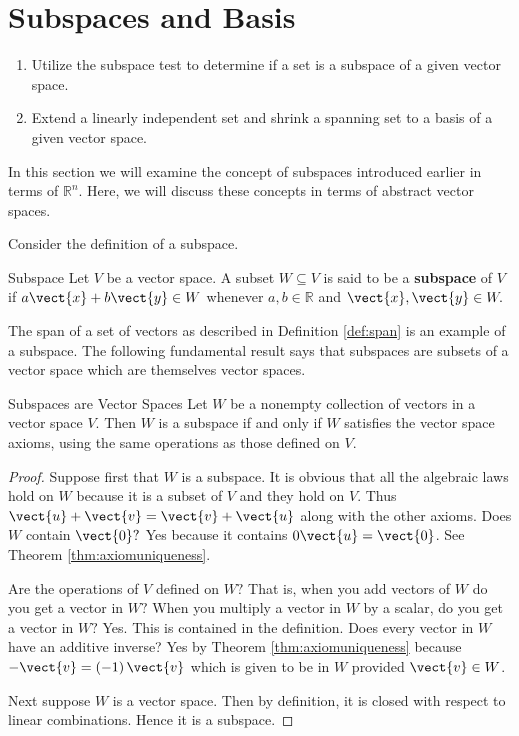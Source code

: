\section{Subspaces and Basis}

\begin{outcome}
\begin{enumerate}
\item[A.] Utilize the subspace test to determine if a set is a subspace of a given vector space.

\item[B.] Extend a linearly independent set and shrink a spanning set to a basis of a given vector space. 
\end{enumerate}
\end{outcome}

In this section we will examine the concept of subspaces introduced earlier in terms of $\mathbb{R}^n$. Here, we will discuss these concepts in terms of abstract vector spaces. 

Consider the definition of a subspace.

\begin{definition}{Subspace}\label{def:subspace}
Let $V$ be a vector space. A subset $W\subseteq V$ is said to be a \textbf{subspace} of $V$ if $a\vect{x}+b\vect{y}
\in W$ whenever $a,b\in \mathbb{R}$ and $\vect{x},\vect{y}\in W.$
\end{definition}

The span of a set of vectors as described in Definition \ref{def:span} is an example of a subspace. The following fundamental result says that subspaces are subsets of a
vector space which are themselves vector spaces.

\begin{theorem}{Subspaces are Vector Spaces}\label{thm:subspacesarevectorspaces}
Let $W$ be a nonempty collection of vectors in a vector space $V$. Then $W$
is a subspace if and only if $W$ satisfies the vector space axioms, using the same
operations as those defined on $V$.
\end{theorem}

\begin{proof}
Suppose first that $W$ is a subspace. It is obvious that
all the algebraic laws hold on $W$ because it is a subset of $V$ and they
hold on $V$. Thus $\vect{u}+\vect{v}=\vect{v}+\vect{u}$ along with the other axioms. Does $W$
contain $\vect{0}?$ Yes because it contains $0\vect{u}=\vect{0}$. See
Theorem \ref{thm:axiomuniqueness}.

 Are the operations of $V$ defined on $W?$ That is,
when you add vectors of $W$ do you get a vector in $W?$ When you multiply a
vector in $W$ by a scalar, do you get a vector in $W?$ Yes. This is
contained in the definition. Does every vector in $W$ have an additive
inverse? Yes by Theorem \ref{thm:axiomuniqueness} because $-\vect{v}=\left(
-1\right) \vect{v}$ which is given to be in $W$ provided $\vect{v}\in W$.

Next suppose $W$ is a vector space. Then by definition, it is closed with
respect to linear combinations. Hence it is a subspace. 
\end{proof}

